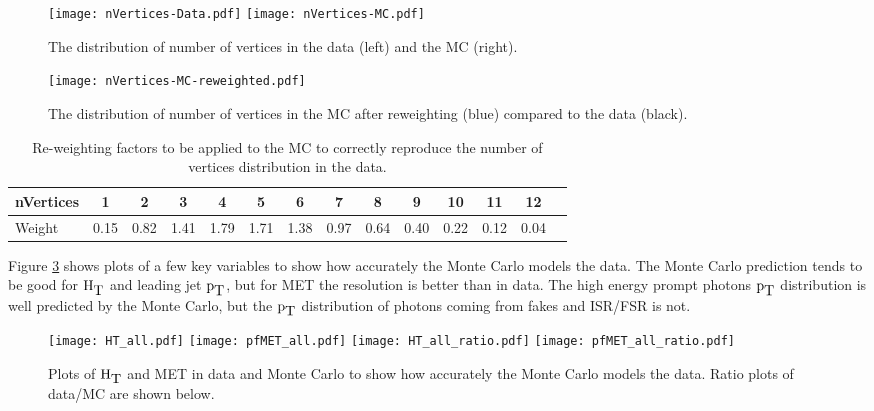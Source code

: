 \begin{figure}
\texttt{[image: nVertices-Data.pdf]}
\texttt{[image: nVertices-MC.pdf]}
\caption{The distribution of number of vertices in the data (left) and the MC
(right).}
\label{fig:nVertices}
\end{figure}

\begin{figure}
\begin{center}
\texttt{[image: nVertices-MC-reweighted.pdf]}
\end{center}
\caption{The distribution of number of vertices in the MC after reweighting
(blue) compared to the data (black).}
\label{fig:reweighted}
\end{figure}

\begin{table}
\begin{center}
{\scriptsize
\begin{tabular}{|l|c|c|c|c|c|c|c|c|c|c|c|c|c|}
\hline
nVertices & 1 & 2 & 3 & 4 & 5 & 6 & 7 & 8 & 9 & 10 & 11 & 12 \\
\hline
Weight & 0.15 & 0.82 & 1.41 & 1.79 & 1.71 & 1.38 & 0.97 & 0.64 & 0.40 & 0.22 &
0.12 & 0.04 \\
\hline
\end{tabular}}
\end{center}
\caption{Re-weighting factors to be applied to the MC to correctly reproduce the
number of vertices distribution in the data.}
\label{tab:factors}
\end{table}

Figure \ref{fig:Data_vs_MC} shows plots of a few key variables to show how
accurately the Monte Carlo models the data. The Monte Carlo prediction tends to
be good for $\mbox{H}_{\mbox{T}}$ and leading jet $\mbox{p}_{\mbox{T}}$, but for MET the resolution is better 
than in data. The high energy prompt photons $\mbox{p}_{\mbox{T}}$ distribution is well 
predicted by the Monte Carlo, but the $\mbox{p}_{\mbox{T}}$ distribution of photons coming from 
fakes and ISR/FSR is not. \\

\begin{figure}
\texttt{[image: HT\_all.pdf]}
\texttt{[image: pfMET\_all.pdf]}
\texttt{[image: HT\_all\_ratio.pdf]}
\texttt{[image: pfMET\_all\_ratio.pdf]}
\caption{Plots of $\mbox{H}_{\mbox{T}}$ and MET in data and Monte Carlo to show how accurately
the Monte Carlo models the data. Ratio plots of data/MC are shown below.}
\label{fig:Data_vs_MC}
\end{figure}

